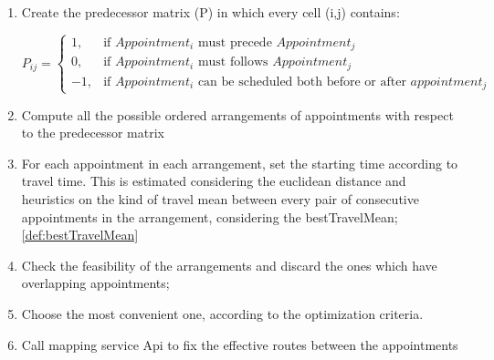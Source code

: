 \begin{enumerate}
\item Create the predecessor matrix (P) in which every cell (i,j) contains:

\[
    P_{ij}=
    \begin{cases}
      1, &\text{if $Appointment_i$ must precede $Appointment_j$} \\
      0, &\text{if $Appointment_i$ must follows $Appointment_j$} \\
      -1, &\text{if $Appointment_i$ can be scheduled both before or after $appointment_j$}
    \end{cases}
\]

\item Compute all the possible ordered arrangements of appointments with respect to the predecessor matrix
\item For each appointment in each arrangement, set the starting time according to travel time. This is estimated considering the euclidean distance and heuristics on the kind of travel mean between every pair of consecutive appointments in the arrangement, considering the bestTravelMean; \ref{def:bestTravelMean}
\item Check the feasibility of the arrangements and discard the ones which have overlapping appointments;
\item Choose the most convenient one, according to the optimization criteria.
\item Call mapping service Api to fix the effective routes between the appointments
\end{enumerate}

